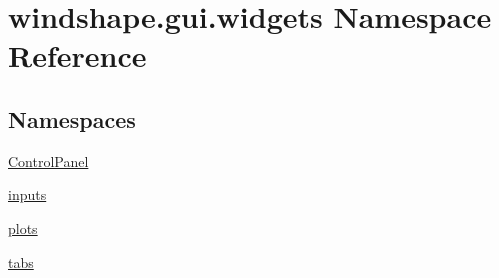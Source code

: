 \hypertarget{namespacewindshape_1_1gui_1_1widgets}{}\section{windshape.\+gui.\+widgets Namespace Reference}
\label{namespacewindshape_1_1gui_1_1widgets}
\subsection*{Namespaces}
\begin{DoxyCompactItemize}
\item 
 \mbox{\hyperlink{namespacewindshape_1_1gui_1_1widgets_1_1_control_panel}{Control\+Panel}}
\item 
 \mbox{\hyperlink{namespacewindshape_1_1gui_1_1widgets_1_1inputs}{inputs}}
\item 
 \mbox{\hyperlink{namespacewindshape_1_1gui_1_1widgets_1_1plots}{plots}}
\item 
 \mbox{\hyperlink{namespacewindshape_1_1gui_1_1widgets_1_1tabs}{tabs}}
\end{DoxyCompactItemize}

